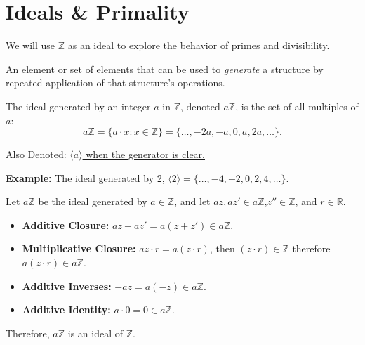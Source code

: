 \newpage

\section{Ideals \& Primality}
We will use $\mathbb{Z}$ as an ideal to explore the behavior of primes and divisibility.

\begin{Def}[Generator]

    An element or set of elements that can be used to \textit{generate} a structure by repeated application of that structure's operations.
\end{Def}


\begin{Def}

    The ideal generated by an integer \( a \) in \( \mathbb{Z} \), denoted $a\mathbb{Z}$, is the set of all multiples of \( a \):
    \begin{equation*}
        a\mathbb{Z} = \{ a \cdot x : x \in \mathbb{Z} \}= \{ \ldots, -2a, -a, 0, a, 2a, \ldots \}.
    \end{equation*}

    \noindent
    Also Denoted: \underline{$\langle a \rangle$ when the generator is clear.}
\end{Def}

\noindent
\textbf{Example:} The ideal generated by 2, $\langle 2 \rangle=\{\ldots,-4,-2,0,2,4,\ldots\}$.

\begin{Proof}

    Let $a\mathbb{Z}$ be the ideal generated by $a \in \mathbb{Z}$, and let $az, az' \in a\mathbb{Z}$,$z'' \in \mathbb{Z}$, and $r \in \mathbb{R}$.
    \begin{itemize}
        \item \textbf{Additive Closure:} $az + az' = a(z + z') \in a\mathbb{Z}$.
        \item \textbf{Multiplicative Closure:} $az \cdot r = a(z \cdot r)$, then $(z\cdot r)\in\mathbb{Z}$ therefore $a(z \cdot r)\in a\mathbb{Z}$.
        \item \textbf{Additive Inverses:} $-az = a(-z) \in a\mathbb{Z}$.
        \item \textbf{Additive Identity:} $a \cdot 0 = 0 \in a\mathbb{Z}$.

    \end{itemize}
    Therefore, $a\mathbb{Z}$ is an ideal of $\mathbb{Z}$.
\end{Proof}


